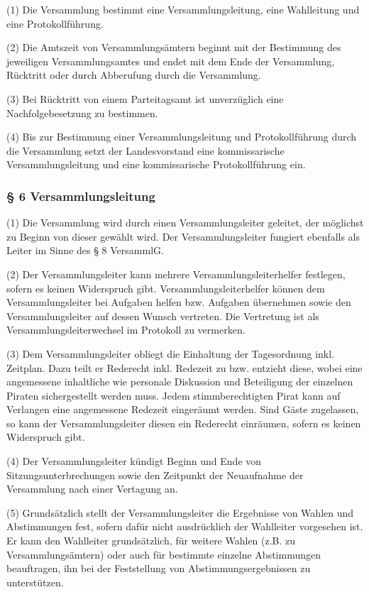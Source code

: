 (1) Die Versammlung bestimmt eine Versammlungsleitung, eine Wahlleitung
und eine Protokollführung.

(2) Die Amtszeit von Versammlungsämtern beginnt mit der Bestimmung des
jeweiligen Versammlungsamtes und endet mit dem Ende der Versammlung,
Rücktritt oder durch Abberufung durch die Versammlung.

(3) Bei Rücktritt von einem Parteitagsamt ist unverzüglich eine
Nachfolgebesetzung zu bestimmen.

(4) Bis zur Bestimmung einer Versammlungsleitung und Protokollführung
durch die Versammlung setzt der Landesvorstand eine kommissarische
Versammlungsleitung und eine kommissarische Protokollführung ein.

\subsubsection{§ 6 Versammlungsleitung}

(1) Die Versammlung wird durch einen Versammlungsleiter geleitet, der
möglichst zu Beginn von dieser gewählt wird. Der Versammlungsleiter
fungiert ebenfalls als Leiter im Sinne des § 8 VersammlG.

(2) Der Versammlungsleiter kann mehrere Versammlungsleiterhelfer
festlegen, sofern es keinen Widerspruch gibt. Versammlungsleiterhelfer
können dem Versammlungsleiter bei Aufgaben helfen bzw. Aufgaben
übernehmen sowie den Versammlungsleiter auf dessen Wunsch vertreten. Die
Vertretung ist als Versammlungsleiterwechsel im Protokoll zu vermerken.

(3) Dem Versammlungsleiter obliegt die Einhaltung der Tagesordnung inkl.
Zeitplan. Dazu teilt er Rederecht inkl. Redezeit zu bzw. entzieht diese,
wobei eine angemessene inhaltliche wie personale Diskussion und
Beteiligung der einzelnen Piraten sichergestellt werden muss. Jedem
stimmberechtigten Pirat kann auf Verlangen eine angemessene Redezeit
eingeräumt werden. Sind Gäste zugelassen, so kann der Versammlungsleiter
diesen ein Rederecht einräumen, sofern es keinen Widerspruch gibt.

(4) Der Versammlungsleiter kündigt Beginn und Ende von
Sitzungsunterbrechungen sowie den Zeitpunkt der Neuaufnahme der
Versammlung nach einer Vertagung an.

(5) Grundsätzlich stellt der Versammlungsleiter die Ergebnisse von
Wahlen und Abstimmungen fest, sofern dafür nicht ausdrücklich der
Wahlleiter vorgesehen ist. Er kann den Wahlleiter grundsätzlich, für
weitere Wahlen (z.B. zu Versammlungsämtern) oder auch für bestimmte
einzelne Abstimmungen beauftragen, ihn bei der Feststellung von
Abstimmungsergebnissen zu unterstützen.

